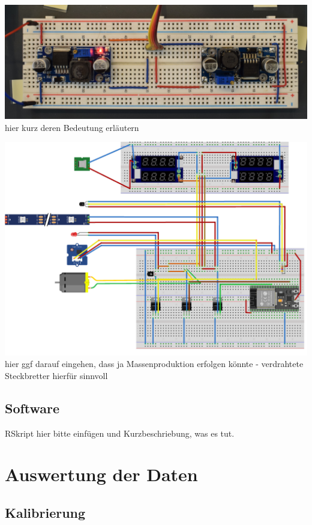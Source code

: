 \documentclass[
]{article}
\begin{document}
\includegraphics{step_up_Modul_Steckbrett.jpg} hier kurz deren Bedeutung
erläutern

\includegraphics{Hauptsteckbrett_Steckplatine_fritzing.png} hier ggf
darauf eingehen, dass ja Massenproduktion erfolgen könnte - verdrahtete
Steckbretter hierfür sinnvoll

\hypertarget{software}{%
\subsection{Software}\label{software}}

RSkript hier bitte einfügen und Kurzbeschriebung, was es tut.

\hypertarget{auswertung-der-daten}{%
\section{Auswertung der Daten}\label{auswertung-der-daten}}

\hypertarget{kalibrierung}{%
\subsection{Kalibrierung}\label{kalibrierung}}
\end{document}
